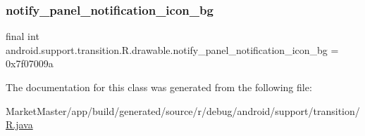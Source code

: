 \subsubsection{\texorpdfstring{notify\+\_\+panel\+\_\+notification\+\_\+icon\+\_\+bg}{notify\_panel\_notification\_icon\_bg}}
{\footnotesize\ttfamily final int android.\+support.\+transition.\+R.\+drawable.\+notify\+\_\+panel\+\_\+notification\+\_\+icon\+\_\+bg = 0x7f07009a\hspace{0.3cm}{\ttfamily [static]}}



The documentation for this class was generated from the following file\+:\begin{DoxyCompactItemize}
\item 
Market\+Master/app/build/generated/source/r/debug/android/support/transition/\mbox{\hyperlink{debug_2android_2support_2transition_2R_8java}{R.\+java}}\end{DoxyCompactItemize}
